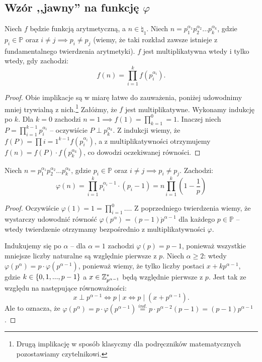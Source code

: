 \subsection{Wzór ,,jawny'' na funkcję \texorpdfstring{\(\varphi\)}{phi}}
\begin{theorem}
	\label{nt:closedmulti}
	Niech \(f\) będzie funkcją arytmetyczną, a \(n \in \natural_1\).
	Niech \(n = p_1^{\alpha_1}p_2^{\alpha_2}\ldots p_k^{\alpha_k}\), gdzie
	\(p_i \in \mathbb P\) oraz \(i \neq j \implies p_i \neq p_j\) (wiemy, że taki rozkład zawsze istnieje z fundamentalnego twierdzenia arytmetyki).
	\(f\) jest multiplikatywna wtedy i tylko wtedy, gdy zachodzi:
	\begin{equation*}
		f(n) = \prod_{i=1}^{k} f(p_i^{\alpha_i}).
	\end{equation*}
\end{theorem}
\begin{proof}
	Obie implikacje są w miarę łatwe do zauważenia, poniżej udowodnimy mniej trywialną z nich.\footnote{Drugą implikację w sposób klasyczny dla podręczników matematycznych pozostawiamy czytelnikowi.}
	Załóżmy, że \(f\) jest multiplikatywne. Wykonamy indukcję po \(k\). Dla \(k = 0\) zachodzi \(n = 1 \implies f(1) = \prod_{k=1}^{0} = 1\).
	Inaczej niech \(P = \prod_{i=1}^{k-1} p_i^{\alpha_i}\) -- oczywiście \(P \perp p_k^{\alpha_k}\).
	Z indukcji wiemy, że \(f(P) = \prod{i=1}^{k-1} f(p_i^{\alpha_i})\), a z multiplikatywności
	otrzymujemy \(f(n) = f(P) \cdot f(p_k^{\alpha_k})\), co dowodzi oczekiwanej równości.
\end{proof}

\begin{corollary}
	Niech \(n = p_1^{\alpha_1}p_2^{\alpha_2}\ldots p_k^{\alpha_k}\), gdzie \(p_i \in \mathbb P\) oraz \(i \neq j \implies p_i \neq p_j\).
	Zachodzi:
	\begin{equation*}
		\varphi(n) = \prod_{i=1}^{k} p_i^{\alpha_i-1} \cdot (p_i-1) = n \prod_{i=1}^{k} (1-\frac{1}{p})
	\end{equation*}
\end{corollary}
\begin{proof}
	Oczywiście \(\varphi(1) = 1 = \prod_{i=1}^{0} \dots\).
	Z poprzedniego twierdzenia wiemy, że wystarczy udowodnić równość \(\varphi(p^{\alpha}) = (p-1) \dot p^{\alpha-1}\) dla każdego \(p \in \mathbb P\) -- wtedy twierdzenie otrzymamy bezpośrednio z multiplikatywności \(\varphi\).

	Indukujemy się po \(\alpha\) -- dla \(\alpha = 1\) zachodzi \(\varphi(p) = p-1\), ponieważ wszystkie mniejsze liczby naturalne są względnie pierwsze z \(p\).
	Niech \(\alpha \geq 2\): wtedy \(\varphi(p^{\alpha}) = p \cdot \varphi(p^{\alpha-1})\), ponieważ wiemy, że tylko liczby postaci \(x + kp^{\alpha-1}\), gdzie \(k \in \set{0,1,...,p-1}\) a \(x \in \mathbb{Z}_{p^{\alpha-1}}^*\) będą względnie pierwsze z \(p\).
	Jest tak ze względu na następujące równoważności:
	\[x \perp p^{\alpha-1} \iff p \mid x \iff p \mid \left(x+p^{\alpha-1}\right).\]
	Ale to oznacza, że \(\varphi(p^{\alpha}) = p\cdot\varphi(p^{\alpha-1}) \stackrel{ind.}{=} p\cdot p^{\alpha-2}(p-1) = (p-1)p^{\alpha-1}\).
\end{proof}
